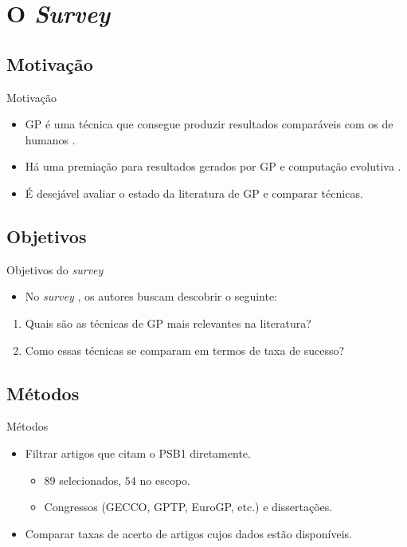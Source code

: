 \section{O \textit{Survey}}
\subsection{Motivação}
\begin{frame}{Motivação}
  \begin{itemize}
    \item GP é uma técnica que consegue produzir resultados comparáveis com
      os de humanos \cite{fieldguide}.
    \item Há uma premiação para
      resultados gerados por GP e computação evolutiva \cite{humies}.
    \item É desejável avaliar o estado da literatura de GP e comparar técnicas.
  \end{itemize}
\end{frame}

\subsection{Objetivos}
\begin{frame}{Objetivos do \textit{survey}}
  \begin{itemize}
    \item No \textit{survey} \cite{survey}, os autores buscam descobrir o seguinte:
  \end{itemize}
  \begin{enumerate}
    \item Quais são as técnicas de GP mais relevantes na literatura?
    \item Como essas técnicas se comparam em termos de taxa de sucesso?
  \end{enumerate}
\end{frame}

\subsection{Métodos}
\begin{frame}{Métodos}
  \begin{itemize}
    \item Filtrar artigos que citam o PSB1 diretamente.
    \begin{itemize}
      \item $89$ selecionados, $54$ no escopo.
      \item Congressos (GECCO, GPTP, EuroGP, etc.) e dissertações.
    \end{itemize}
    \item Comparar taxas de acerto de artigos cujos dados estão disponíveis.
  \end{itemize}
\end{frame}
